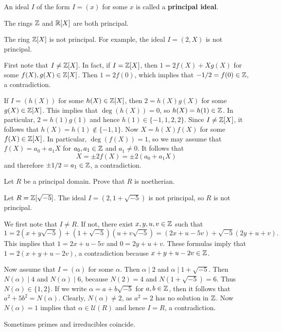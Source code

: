 An ideal $I$ of the form $I=(x)$ for some $x$ is called a \textbf{principal ideal}. 

The rings $\mathbb{Z}$ and $\mathbb{R}[X]$ are both principal. 

\begin{example}
	The ring $\mathbb{Z}[X]$ is not principal. For example, the ideal
	$I=(2,X)$ is not principal. 
	
	First note that $I\ne\mathbb{Z}[X]$. In fact, if $I=\mathbb{Z}[X]$, then 
	$1=2f(X)+Xg(X)$ for some $f(X),g(X)\in\mathbb{Z}[X]$. Then 
	$1=2f(0)$, which implies that $-1/2=f(0)\in\mathbb{Z}$, a contradiction. 
	
	If $I=(h(X))$ for some $h(X)\in\mathbb{Z}[X]$, then $2=h(X)g(X)$ for some $g(X)\in\mathbb{Z}[X]$. This
	implies that $\deg(h(X))=0$, so $h(X)=h(1)\in\mathbb{Z}$. In particular, $2=h(1)g(1)$ and hence
	$h(1)\in\{-1,1,2,2\}$. Since $I\ne\mathbb{Z}[X]$, it follows that $h(X)=h(1)\not\in\{-1,1\}$. Now      
	$X=h(X)f(X)$ for some $f(X)\in\mathbb{Z}[X]$. In particular, $\deg(f(X))=1$, so
	we may assume that $f(X)=a_0+a_1X$ for $a_0,a_1\in\mathbb{Z}$ and $a_1\ne 0$. 	
	It follows that 
	\[
	X=\pm 2f(X)=\pm2(a_0+a_1X)
	\]
	and therefore $\pm1/2=a_1\in\mathbb{Z}$, a contradiction.
\end{example}

\begin{exercise}
\label{xca:principal=>noetherian}
    Let $R$ be a principal domain. Prove that $R$ is noetherian.
\end{exercise}

\begin{example}
	Let $R=\mathbb{Z}[\sqrt{-5}]$.  
	The ideal $I=(2,1+\sqrt{-5})$ is not principal, so $R$ is not principal. 
	
	We first note that $I\ne R$. If not, there exist $x,y,u,v\in\mathbb{Z}$ such that 
	\[
	1=2(x+y\sqrt{-5})+(1+\sqrt{-5})(u+v\sqrt{-5})=(2x+u-5v)+\sqrt{-5}(2y+u+v).
	\]
	This implies that $1=2x+u-5v$ and $0=2y+u+v$. These formulas imply that
	$1=2(x+y+u-2v)$, a contradiction because $x+y+u-2v\in\mathbb{Z}$. 
	
	Now assume that $I=(\alpha)$ for some $\alpha$. Then $\alpha\mid 2$ and $\alpha\mid 1+\sqrt{-5}$. Then
	$N(\alpha)\mid 4$ and $N(\alpha)\mid 6$, because $N(2)=4$ and $N(1+\sqrt{-5})=6$. 
	Thus $N(\alpha)\in\{1,2\}$. If we write
	$\alpha=a+b\sqrt{-5}$ for $a,b\in\mathbb{Z}$, then it follows that 
	$a^2+5b^2=N(\alpha)$. Clearly, $N(\alpha)\ne 2$, as $a^2=2$ has no solution in $\mathbb{Z}$.
	Now $N(\alpha)= 1$ implies that $\alpha\in\mathcal{U}(R)$ and hence 
	$I=R$, a contradiction.   
\end{example}

Sometimes primes and irreducibles coincide. 

